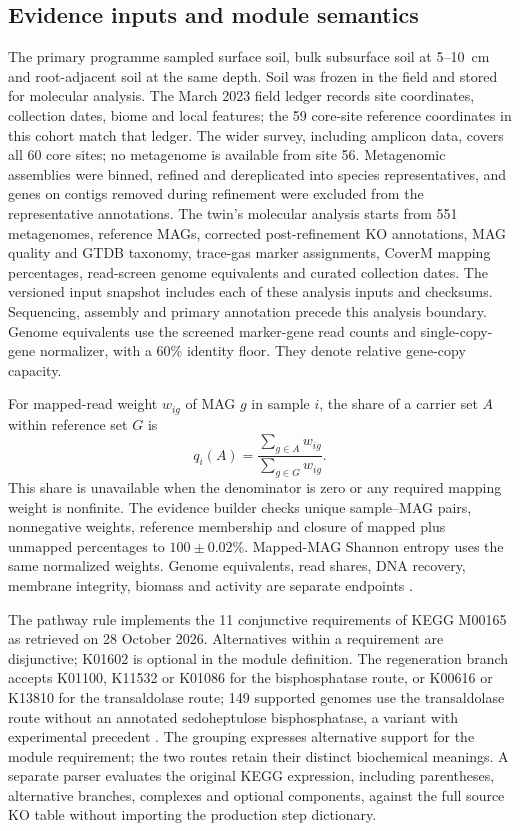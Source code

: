 \documentclass[11pt,a4paper]{article}
\begin{document}
\subsection{Evidence inputs and module semantics}
The primary programme sampled surface soil, bulk subsurface soil at 5--10~cm and root-adjacent soil at the same depth. Soil was frozen in the field and stored for molecular analysis. The March 2023 field ledger records site coordinates, collection dates, biome and local features; the 59 core-site reference coordinates in this cohort match that ledger. The wider survey, including amplicon data, covers all 60 core sites; no metagenome is available from site 56. Metagenomic assemblies were binned, refined and dereplicated into species representatives, and genes on contigs removed during refinement were excluded from the representative annotations. The twin's molecular analysis starts from 551 metagenomes, \ReferenceMAGs{} reference MAGs, corrected post-refinement KO annotations, MAG quality and GTDB taxonomy, trace-gas marker assignments, CoverM mapping percentages, read-screen genome equivalents and curated collection dates. The versioned input snapshot includes each of these analysis inputs and checksums. Sequencing, assembly and primary annotation precede this analysis boundary. Genome equivalents use the screened marker-gene read counts and single-copy-gene normalizer, with a 60\% identity floor. They denote relative gene-copy capacity.

For mapped-read weight $w_{ig}$ of MAG $g$ in sample $i$, the share of a carrier set $A$ within reference set $G$ is
\begin{equation}
q_i(A)=\frac{\sum_{g\in A}w_{ig}}{\sum_{g\in G}w_{ig}}.
\end{equation}
This share is unavailable when the denominator is zero or any required mapping weight is nonfinite. The evidence builder checks unique sample--MAG pairs, nonnegative weights, reference membership and closure of mapped plus unmapped percentages to $100\pm0.02\%$. Mapped-MAG Shannon entropy uses the same normalized weights. Genome equivalents, read shares, DNA recovery, membrane integrity, biomass and activity are separate endpoints \cite{carini2016relicdna,lennon2018relicdna}.

The pathway rule implements the 11 conjunctive requirements of KEGG M00165 as retrieved on 28 October 2026. Alternatives within a requirement are disjunctive; K01602 is optional in the module definition. The regeneration branch accepts K01100, K11532 or K01086 for the bisphosphatase route, or K00616 or K13810 for the transaldolase route; 149 supported genomes use the transaldolase route without an annotated sedoheptulose bisphosphatase, a variant with experimental precedent \cite{frolov2019transaldolase}. The grouping expresses alternative support for the module requirement; the two routes retain their distinct biochemical meanings. A separate parser evaluates the original KEGG expression, including parentheses, alternative branches, complexes and optional components, against the full source KO table without importing the production step dictionary.
\end{document}
